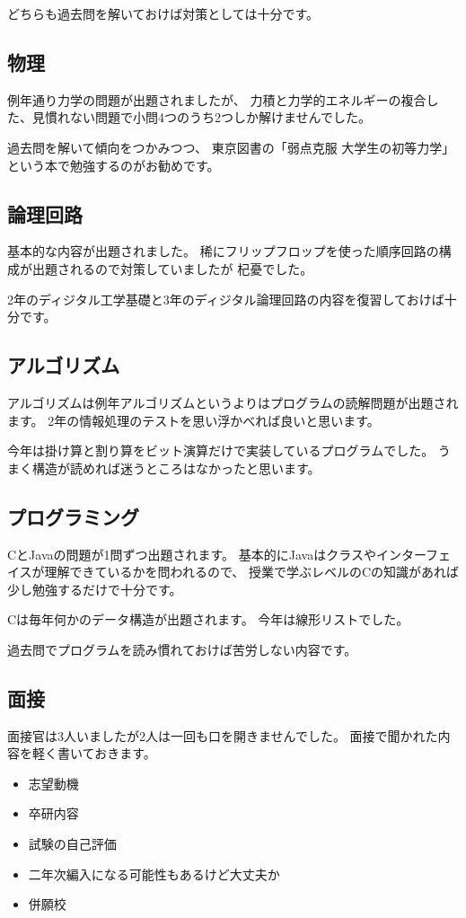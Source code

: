 \documentclass[]{jsarticle}
\begin{document}
        どちらも過去問を解いておけば対策としては十分です。
    \subsection*{物理}
        例年通り力学の問題が出題されましたが、
        力積と力学的エネルギーの複合した、見慣れない問題で小問4つのうち2つしか解けませんでした。

        過去問を解いて傾向をつかみつつ、
        東京図書の「弱点克服 大学生の初等力学」という本で勉強するのがお勧めです。
    \subsection*{論理回路}
        基本的な内容が出題されました。
        稀にフリップフロップを使った順序回路の構成が出題されるので対策していましたが
        杞憂でした。

        2年のディジタル工学基礎と3年のディジタル論理回路の内容を復習しておけば十分です。
    \subsection*{アルゴリズム}
        アルゴリズムは例年アルゴリズムというよりはプログラムの読解問題が出題されます。
        2年の情報処理のテストを思い浮かべれば良いと思います。

        今年は掛け算と割り算をビット演算だけで実装しているプログラムでした。
        うまく構造が読めれば迷うところはなかったと思います。
    \subsection*{プログラミング}
        CとJavaの問題が1問ずつ出題されます。
        基本的にJavaはクラスやインターフェイスが理解できているかを問われるので、
        授業で学ぶレベルのCの知識があれば少し勉強するだけで十分です。

        Cは毎年何かのデータ構造が出題されます。
        今年は線形リストでした。

        過去問でプログラムを読み慣れておけば苦労しない内容です。
    \subsection*{面接}
        面接官は3人いましたが2人は一回も口を開きませんでした。
        面接で聞かれた内容を軽く書いておきます。
        \begin{itemize}
            \item 志望動機
            \item 卒研内容
            \item 試験の自己評価
            \item 二年次編入になる可能性もあるけど大丈夫か
            \item 併願校
        \end{itemize}
\end{document}
